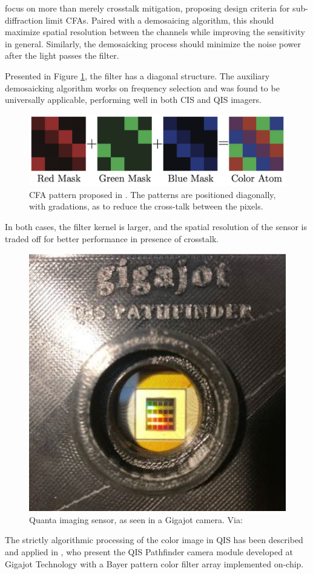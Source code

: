 \cite{elgendy2019color} focus on more than merely crosstalk mitigation, proposing design criteria for sub-diffraction limit CFAs.
Paired with a demosaicing algorithm, this should maximize spatial resolution between the channels while improving the sensitivity in general. Similarly, the demosaicking process should minimize the noise power after the light passes the filter. 

Presented in Figure \ref{fig:cfaelgendy}, the filter has a diagonal structure. The auxiliary demosaicking algorithm works on frequency selection and was found to be universally applicable, performing well in both CIS and QIS imagers.

\begin{figure}[h]
  \centering
  \includegraphics[width=0.7\linewidth]{imgs/cfaelgendy.png}
  \caption{CFA pattern proposed in \cite{elgendy2019color}. The patterns are positioned diagonally, with gradations, as to reduce the cross-talk between the pixels.}
  \label{fig:cfaelgendy}
\end{figure}

In both cases, the filter kernel is larger, and the spatial resolution of the sensor is traded off for better performance in presence of crosstalk. 


 \begin{figure}[h]
  \centering
  \includegraphics[width=0.5\linewidth]{imgs/qis/gigajot.png}
  \caption{Quanta imaging sensor, as seen in a Gigajot camera. Via: \cite{Gnanasambandam_2019}}
\end{figure}

The strictly algorithmic processing of the color image in QIS has been described and applied in \cite{Gnanasambandam_2019}, who present the QIS Pathfinder camera module developed at Gigajot Technology with a Bayer pattern color filter array implemented on-chip. 